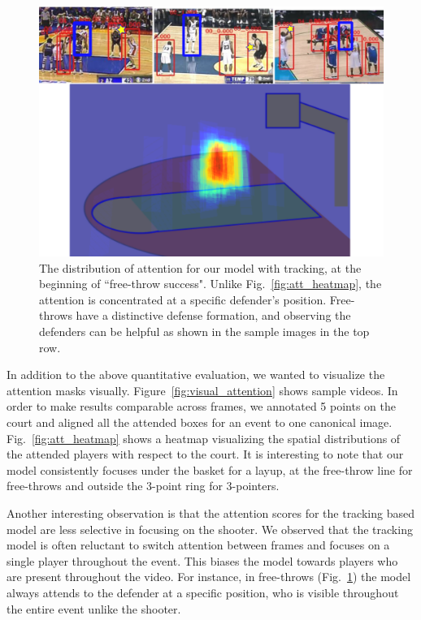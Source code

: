 \begin{figure}[ht!]
\begin{center}
   \includegraphics[width=0.9\linewidth]{images/track_spec_output.pdf}
\end{center}
  \vspace{-4mm}
\caption{The distribution of attention for our model with tracking,
     at the beginning of ``free-throw success". Unlike
     Fig.~\ref{fig:att_heatmap}, the attention is concentrated at a specific
     defender's position. Free-throws have a distinctive defense formation, and
   observing the defenders can be helpful as shown in the sample images in
 the top row.} 
  \vspace{-4mm}
\label{fig:visual_attention_trackspec}
\end{figure}

In addition to the above quantitative evaluation, we wanted to visualize the
attention masks visually.  Figure~\ref{fig:visual_attention} shows 
sample videos.  In order to make results comparable across frames, we annotated
5 points on the court and aligned all the attended boxes for an event to one
canonical image.  Fig.~\ref{fig:att_heatmap} shows a heatmap  visualizing the
spatial distributions of the attended players with respect to the court. It is
interesting to note that our model consistently focuses under the basket for a
layup, at the free-throw line for free-throws and outside the 3-point ring for
3-pointers.

Another interesting observation
is that the attention scores for the tracking based model are less selective in
focusing on the shooter.  We observed that the tracking model is often
reluctant to switch attention between frames and focuses on a single
player throughout the event. This biases the model towards players who are
present throughout the video. For instance, in free-throws
(Fig.~\ref{fig:visual_attention_trackspec}) the model always
attends to the defender at a specific position, who is visible throughout the
entire event unlike the shooter.

\vspace{-2mm}
